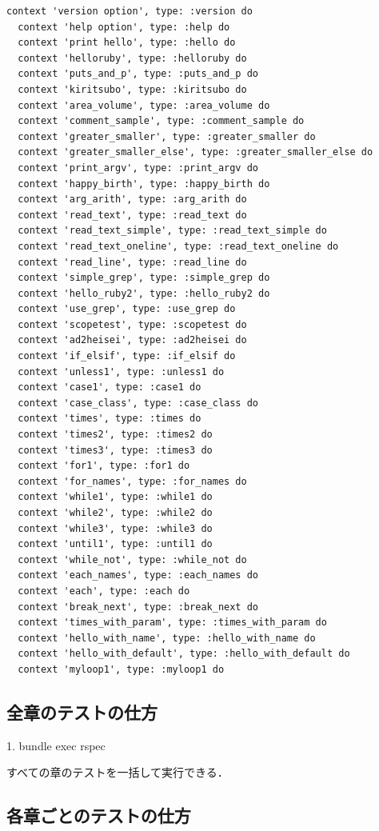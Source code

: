 \begin{lstlisting}[style=customRuby,basicstyle={\scriptsize\ttfamily}]
  context 'version option', type: :version do
  context 'help option', type: :help do
  context 'print hello', type: :hello do
  context 'helloruby', type: :helloruby do
  context 'puts_and_p', type: :puts_and_p do
  context 'kiritsubo', type: :kiritsubo do
  context 'area_volume', type: :area_volume do
  context 'comment_sample', type: :comment_sample do
  context 'greater_smaller', type: :greater_smaller do
  context 'greater_smaller_else', type: :greater_smaller_else do
  context 'print_argv', type: :print_argv do
  context 'happy_birth', type: :happy_birth do
  context 'arg_arith', type: :arg_arith do
  context 'read_text', type: :read_text do
  context 'read_text_simple', type: :read_text_simple do
  context 'read_text_oneline', type: :read_text_oneline do
  context 'read_line', type: :read_line do
  context 'simple_grep', type: :simple_grep do
  context 'hello_ruby2', type: :hello_ruby2 do
  context 'use_grep', type: :use_grep do
  context 'scopetest', type: :scopetest do
  context 'ad2heisei', type: :ad2heisei do
  context 'if_elsif', type: :if_elsif do
  context 'unless1', type: :unless1 do
  context 'case1', type: :case1 do
  context 'case_class', type: :case_class do
  context 'times', type: :times do
  context 'times2', type: :times2 do
  context 'times3', type: :times3 do
  context 'for1', type: :for1 do
  context 'for_names', type: :for_names do
  context 'while1', type: :while1 do
  context 'while2', type: :while2 do
  context 'while3', type: :while3 do
  context 'until1', type: :until1 do
  context 'while_not', type: :while_not do
  context 'each_names', type: :each_names do
  context 'each', type: :each do
  context 'break_next', type: :break_next do
  context 'times_with_param', type: :times_with_param do
  context 'hello_with_name', type: :hello_with_name do
  context 'hello_with_default', type: :hello_with_default do
  context 'myloop1', type: :myloop1 do
\end{lstlisting}
\subsection{全章のテストの仕方}

1. bundle exec rspec

すべての章のテストを一括して実行できる．

\subsection{各章ごとのテストの仕方}


